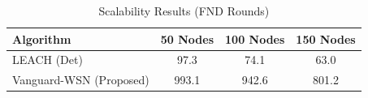 \begin{table}[h]
\centering
\caption{Scalability Results (FND Rounds)}
\begin{tabular}{|l|c|c|c|}
\hline
\textbf{Algorithm} & \textbf{50 Nodes} & \textbf{100 Nodes} & \textbf{150 Nodes} \\ \hline
LEACH (Det) & 97.3 & 74.1 & 63.0 \\ 
Vanguard-WSN (Proposed) & 993.1 & 942.6 & 801.2 \\ 
 \hline 
\end{tabular}
\end{table}